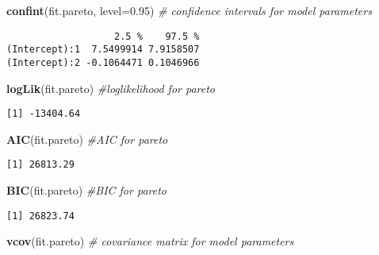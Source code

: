 \documentclass[]{book}
\newenvironment{Shaded}{\begin{snugshade}}{\end{snugshade}}
\newcommand{\KeywordTok}[1]{\textcolor[rgb]{0.13,0.29,0.53}{\textbf{#1}}}
\newcommand{\DataTypeTok}[1]{\textcolor[rgb]{0.13,0.29,0.53}{#1}}
\newcommand{\FloatTok}[1]{\textcolor[rgb]{0.00,0.00,0.81}{#1}}
\newcommand{\CommentTok}[1]{\textcolor[rgb]{0.56,0.35,0.01}{\textit{#1}}}
\newcommand{\NormalTok}[1]{#1}
\theoremstyle{definition}
\theoremstyle{definition}
\theoremstyle{definition}
\theoremstyle{remark}
\begin{document}
\begin{Shaded}
\begin{Highlighting}[]
\KeywordTok{confint}\NormalTok{(fit.pareto, }\DataTypeTok{level=}\FloatTok{0.95}\NormalTok{)  }\CommentTok{# confidence intervals for model parameters }
\end{Highlighting}
\end{Shaded}

\begin{verbatim}
                   2.5 %    97.5 %
(Intercept):1  7.5499914 7.9158507
(Intercept):2 -0.1064471 0.1046966
\end{verbatim}

\begin{Shaded}
\begin{Highlighting}[]
\KeywordTok{logLik}\NormalTok{(fit.pareto)               }\CommentTok{#loglikelihood for pareto}
\end{Highlighting}
\end{Shaded}

\begin{verbatim}
[1] -13404.64
\end{verbatim}

\begin{Shaded}
\begin{Highlighting}[]
\KeywordTok{AIC}\NormalTok{(fit.pareto)                  }\CommentTok{#AIC for pareto}
\end{Highlighting}
\end{Shaded}

\begin{verbatim}
[1] 26813.29
\end{verbatim}

\begin{Shaded}
\begin{Highlighting}[]
\KeywordTok{BIC}\NormalTok{(fit.pareto)                  }\CommentTok{#BIC for pareto}
\end{Highlighting}
\end{Shaded}

\begin{verbatim}
[1] 26823.74
\end{verbatim}

\begin{Shaded}
\begin{Highlighting}[]
\KeywordTok{vcov}\NormalTok{(fit.pareto)                 }\CommentTok{# covariance matrix for model parameters }
\end{Highlighting}
\end{Shaded}
\end{document}

